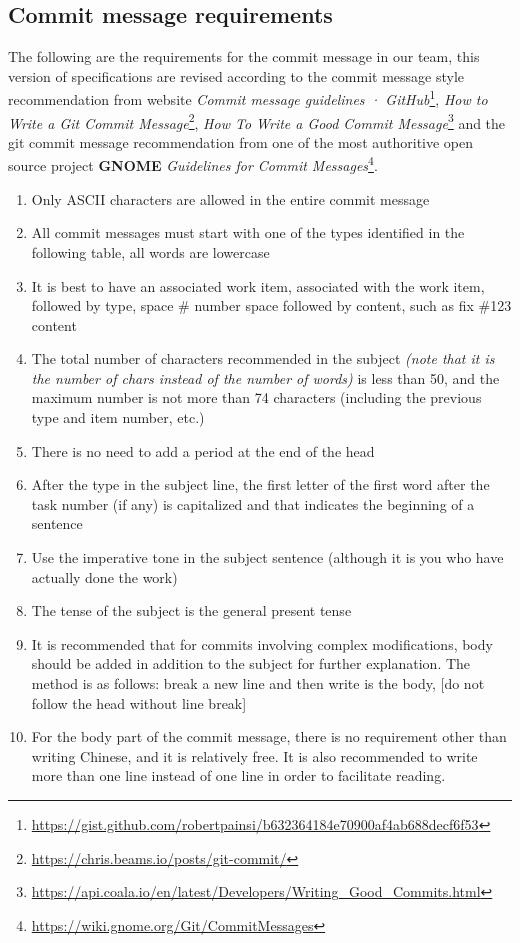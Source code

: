 \documentclass[a4paper]{report}
\begin{document}
\subsection{Commit message requirements}
The following are the requirements for the commit message in our team, this version of specifications are revised according to the commit message style recommendation from website \emph{Commit message guidelines · GitHub}\footnote{\url{https://gist.github.com/robertpainsi/b632364184e70900af4ab688decf6f53}}, \emph{How to Write a Git Commit Message}\footnote{\url{https://chris.beams.io/posts/git-commit/}}, \emph{How To Write a Good Commit Message}\footnote{\url{https://api.coala.io/en/latest/Developers/Writing_Good_Commits.html}} and the git commit message recommendation from one of the most authoritive open source project \textbf{GNOME} \emph{Guidelines for Commit Messages}\footnote{\url{https://wiki.gnome.org/Git/CommitMessages}}.
\begin{enumerate}
\item
Only ASCII characters are allowed in the entire commit message
\item
All commit messages must start with one of the types identified in the following table, all words are lowercase
\item
It is best to have an associated work item, associated with the work item, followed by type, space \# number space followed by content, such as fix \#123 content
\item
The total number of characters recommended in the subject \emph{(note that it is the number of chars instead of the number of words)} is less than 50, and the maximum number is not more than 74 characters (including the previous type and item number, etc.)
\item
There is no need to add a period at the end of the head
\item 
After the type in the subject line, the first letter of the first word after the task number (if any) is capitalized and that indicates the beginning of a sentence
\item
Use the imperative tone in the subject sentence (although it is you who have actually done the work)
\item
The tense of the subject is the general present tense
\item
It is recommended that for commits involving complex modifications, body should be added in addition to the subject for further explanation. The method is as follows: break a new line and then write is the body, [do not follow the head without line break]
\item
For the body part of the commit message, there is no requirement other than writing Chinese, and it is relatively free. It is also recommended to write more than one line instead of one line in order to facilitate reading.
\end{enumerate}
\end{document}
